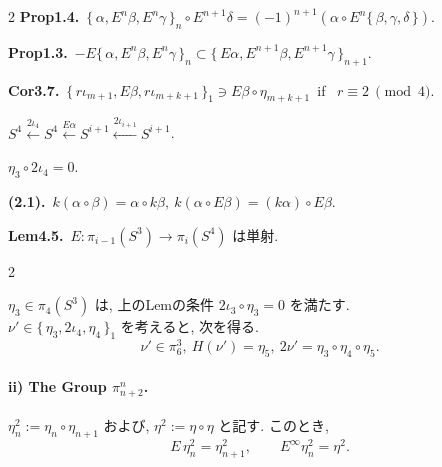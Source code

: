 \documentclass[10pt, leqno]{ltjsarticle}
\newcommand{\toda}[1]{\{\,#1\,\}}              %
\newcommand{\todai}[2][]{\{\,#2\,\}_{#1}}      %
\newcommand{\pis}[2]{\pi_{#1}(#2)}       %
\numberwithin{equation}{section}
\theoremstyle{plain}
\theoremstyle{definition}
\theoremstyle{remark}
\begin{document}
\begin{paracol}{2}
\noindent
\textbf{Prop1.4.}\
\(\todai[n]{\alpha, E^n\beta, E^n\gamma}\circ E^{n+1}\delta
= (-1)^{n+1}(\alpha\circ E^n\toda{\beta, \gamma, \delta})\).

\noindent
\textbf{Prop1.3.}\
\(-E\todai[n]{\alpha, E^n\beta, E^n\gamma}
\subset \todai[n+1]{E\alpha, E^{n+1}\beta, E^{n+1}\gamma}\).

\noindent
\textbf{Cor3.7.}\
\(\todai[1]{r\iota_{m+1}, E\beta, r\iota_{m+k+1}}
\ni E\beta\circ\eta_{m+k+1}\)\ 
if \ \(r\equiv 2\ \pmod 4\).

\noindent
\(S^4\xleftarrow{2\iota_4}
S^4\xleftarrow{E\alpha}
S^{i+1}\xleftarrow{2\iota_{i+1}}
S^{i+1}\).

\noindent
\(\eta_3\circ 2\iota_4 = 0.\)

\noindent
\textbf{(2.1).}\
\(k(\alpha\circ\beta) = \alpha\circ k\beta,\
k(\alpha\circ E\beta) = (k\alpha)\circ E\beta.\)

\noindent
\textbf{Lem4.5.}\
\(E: \pis{i-1}{S^3}\to\pis{i}{S^4}\) は単射.



\end{paracol}

\begin{paracol}{2}

\(\eta_3\in\pi_4(S^3)\) は, 上のLemの条件 \(2\iota_3\circ\eta_3=0\) を満たす. \\
\(\nu'\in\todai[1]{\eta_3,2\iota_4,\eta_4}\) を考えると, 
次を得る. 
\begin{equation}\label{eq:5.3}
\nu'\in\pi_6^3,\ H(\nu')=\eta_5,\ 2\nu'=\eta_3\circ\eta_4\circ\eta_5 .
\end{equation}


\paragraph*{ii) The Group \(\pi^{n}_{n+2}\).}
\(\eta_n^{2}:=\eta_n\circ \eta_{n+1}\) および,
\(\eta^{2}:=\eta\circ\eta\) と記す. このとき,
\[
E\,\eta_n^{2}=\eta_{n+1}^{2},\qquad E^{\infty}\eta_n^{2}=\eta^{2}.
\]

\switchcolumn

\end{paracol}
\end{document}
